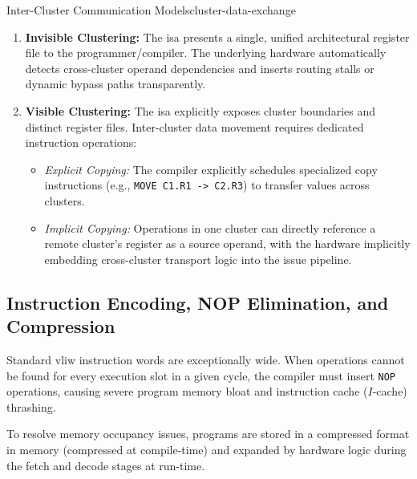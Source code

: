 \begin{concept}{Inter-Cluster Communication Models}{cluster-data-exchange}
    \begin{enumerate}
        \item \textbf{Invisible Clustering:} The \gls{isa} presents a single, unified architectural register file to the programmer/compiler. The underlying hardware automatically detects cross-cluster operand dependencies and inserts routing stalls or dynamic bypass paths transparently.
        \item \textbf{Visible Clustering:} The \gls{isa} explicitly exposes cluster boundaries and distinct register files. Inter-cluster data movement requires dedicated instruction operations:
        \begin{itemize}
            \item \textit{Explicit Copying:} The compiler explicitly schedules specialized copy instructions (e.g., \texttt{MOVE C1.R1 -> C2.R3}) to transfer values across clusters.
            \item \textit{Implicit Copying:} Operations in one cluster can directly reference a remote cluster's register as a source operand, with the hardware implicitly embedding cross-cluster transport logic into the issue pipeline.
        \end{itemize}
    \end{enumerate}
\end{concept}

\subsection{Instruction Encoding, NOP Elimination, and Compression}

Standard \gls{vliw} instruction words are exceptionally wide. When operations cannot be found for every execution slot in a given cycle, the compiler must insert \texttt{NOP} operations, causing severe program memory bloat and instruction cache ($I$-cache) thrashing.

To resolve memory occupancy issues, programs are stored in a compressed format in memory (compressed at compile-time) and expanded by hardware logic during the fetch and decode stages at run-time.

